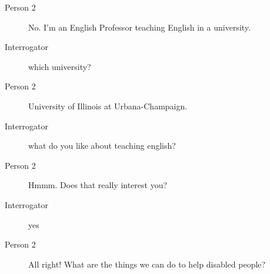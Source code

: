 \begin{itemize}
\begin{description}
\begin{description}
               \item [Person 2] No. I'm an English Professor teaching English in a university.
               \item [Interrogator] which university?
               \item [Person 2] University of Illinois at Urbana-Champaign.
               \item [Interrogator] what do you like about teaching english?
               \item [Person 2] Hmmm. Does that really interest you?
               \item [Interrogator] yes
               \item [Person 2] All right! What are the things we can do to help disabled people?
            \end{description}
      \end{description}



\end{itemize}
